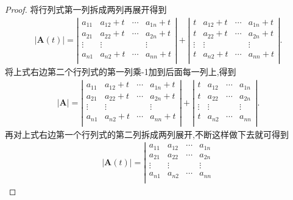 \documentclass[../../main.tex]{subfiles}%
\begin{document}
\begin{proof}

将行列式第一列拆成两列再展开得到
\begin{align*}
|\boldsymbol{A}(t)|=\left| \begin{matrix}
a_{11}&		a_{12}+t&		\cdots&		a_{1n}+t\\
a_{21}&		a_{22}+t&		\cdots&		a_{2n}+t\\
\vdots&		\vdots&		&		\vdots\\
a_{n1}&		a_{n2}+t&		\cdots&		a_{nn}+t\\
\end{matrix} \right|+\left| \begin{matrix}
t&		a_{12}+t&		\cdots&		a_{1n}+t\\
t&		a_{22}+t&		\cdots&		a_{2n}+t\\
\vdots&		\vdots&		&		\vdots\\
t&		a_{n2}+t&		\cdots&		a_{nn}+t\\
\end{matrix} \right|.
\nonumber
\end{align*}
将上式右边第二个行列式的第一列乘-1加到后面每一列上,得到
\begin{align*}
\left| \boldsymbol{A} \right|=\left| \begin{matrix}
a_{11}&		a_{12}+t&		\cdots&		a_{1n}+t\\
a_{21}&		a_{22}+t&		\cdots&		a_{2n}+t\\
\vdots&		\vdots&		&		\vdots\\
a_{n1}&		a_{n2}+t&		\cdots&		a_{nn}+t\\
\end{matrix} \right|+\left| \begin{matrix}
t&		a_{12}&		\cdots&		a_{1n}\\
t&		a_{22}&		\cdots&		a_{2n}\\
\vdots&		\vdots&		&		\vdots\\
t&		a_{n2}&		\cdots&		a_{nn}\\
\end{matrix} \right| .
\nonumber
\end{align*}
再对上式右边第一个行列式的第二列拆成两列展开,不断这样做下去就可得到
\begin{gather*}
|\boldsymbol{A}(t)|=\left| \begin{matrix}
a_{11}&		a_{12}&		\cdots&		a_{1n}\\
a_{21}&		a_{22}&		\cdots&		a_{2n}\\
\vdots&		\vdots&		&		\vdots\\
a_{n1}&		a_{n2}&		\cdots&		a_{nn}\\

\end{matrix}
\end{gather*}
\end{proof}
\end{document}
